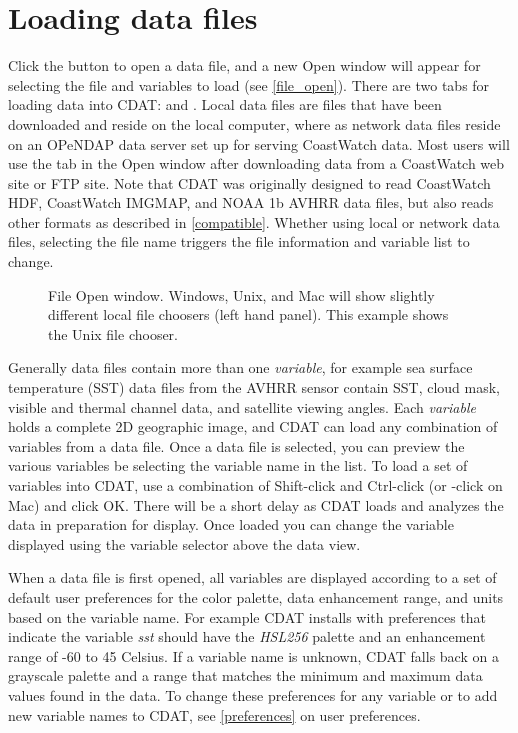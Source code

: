 \section{Loading data files}
\label{loading}

Click the  button to open a data file,
and a new {\gui Open} window will appear for selecting the file
and variables to load (see \autoref{file_open}).  There are two
tabs for loading data into CDAT:  and
.  Local data files are files
that have been downloaded and reside on the local computer, where
as network data files reside on an OPeNDAP data server set up for
serving CoastWatch data.  Most users will use the
 tab in the {\gui Open} window after
downloading data from a CoastWatch web site or FTP site.  Note
that CDAT was originally designed to read CoastWatch HDF,
CoastWatch IMGMAP, and NOAA 1b AVHRR data files, but also reads
other formats as described in \autoref{compatible}.  Whether
using local or network data files, selecting the file name
triggers the file information and variable list to change.

\begin{figure}
  \begin{center}
    \caption[File Open window]{
       File {\gui Open} window.  Windows, Unix, and Mac will show
       slightly different local file choosers (left hand panel).
       This example shows the Unix file chooser.
    }
    \label{file_open}
  \end{center}
\end{figure}

Generally data files contain more than one {\em variable}, for example
sea surface temperature (SST) data files from the AVHRR sensor contain
SST, cloud mask, visible and thermal channel data, and satellite
viewing angles.  Each {\em variable} holds a complete 2D geographic
image, and CDAT can load any combination of variables from a data
file.  Once a data file is selected, you can preview the various
variables be selecting the variable name in the list.  To load a set
of variables into CDAT, use a combination of Shift-click and
Ctrl-click (or -click on Mac) and click OK.  There
will be a short delay as CDAT loads and analyzes the data in
preparation for display.  Once loaded you can change the variable
displayed using the variable selector above the data view.

When a data file is first opened, all variables are displayed
according to a set of default user preferences for the color palette,
data enhancement range, and units based on the variable name.  For
example CDAT installs with preferences that indicate the variable {\em
sst} should have the {\em HSL256} palette and an enhancement range of
-60 to 45 Celsius.  If a variable name is unknown, CDAT falls back on
a grayscale palette and a range that matches the minimum and maximum
data values found in the data.  To change these preferences for any
variable or to add new variable names to CDAT, see
\autoref{preferences} on user preferences.

